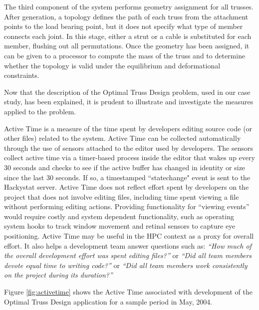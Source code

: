\documentclass[times,10pt,twocolumn]{article}
\begin{document}
The third component of the system performs geometry assignment for all
trusses.  After generation, a topology defines the path of each truss from
the attachment points to the load bearing point, but it does not specify
what type of member connects each joint.  In this stage, either a strut or
a cable is substituted for each member, flushing out all permutations.
Once the geometry has been assigned, it can be given to a processor to
compute the mass of the truss and to determine whether the topology is
valid under the equilibrium and deformational constraints.

Now that the description of the Optimal Truss Design problem, used in our case study, has been explained, it is prudent to illustrate and investigate the measures applied to the problem.

\label{sec:activetime}

Active Time is a measure of the time spent by developers editing
source code (or other files) related to the system.  Active Time can
be collected automatically through the use of sensors attached to the
editor used by developers.  The sensors collect active time via a
timer-based process inside the editor that wakes up every 30 seconds
and checks to see if the active buffer has changed in identity or size
since the last 30 seconds. If so, a timestamped ``statechange" event
is sent to the Hackystat server.  Active Time does not reflect effort
spent by developers on the project that does not involve editing
files, including time spent viewing a file without performing editing
actions.  Providing functionality for ``viewing events'' would require
costly and system dependent functionality, such as operating system
hooks to track window movement and retinal sensors to capture eye
positioning.  Active Time may be useful in the HPC context as a proxy
for overall effort.  It also helps a development team answer questions
such as: {\em ``How much of the overall development effort was spent
editing files?''} or {\em ``Did all team members devote equal time to
writing code?''} or {\em ``Did all team members work consistently on
the project during its duration?''}

Figure \ref{fig:activetime} shows the Active Time associated with development of the
Optimal Truss Design application for a sample period in May, 2004.
\end{document}
